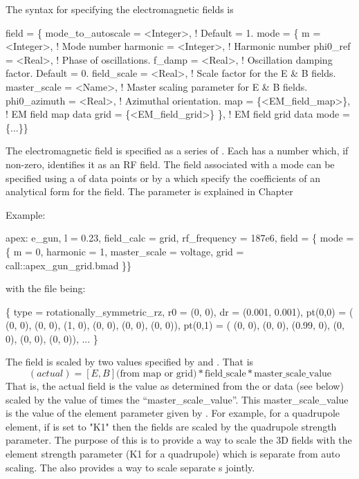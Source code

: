 The syntax for specifying the electromagnetic fields is
\label{v:field}
\begin{example}
  field = \{
    mode_to_autoscale = <Integer>, ! Default = 1.
    mode = \{
      m             = <Integer>,   ! Mode number
      harmonic      = <Integer>,   ! Harmonic number 
      phi0_ref      = <Real>,      ! Phase of oscillations.
      f_damp        = <Real>,      ! Oscillation damping factor. Default = 0.
      field_scale   = <Real>,      ! Scale factor for the E & B fields.
      master_scale  = <Name>,      ! Master scaling parameter for E & B fields.
      phi0_azimuth  = <Real>,      ! Azimuthal orientation.
      map           = \{<EM_field_map>\},     ! EM field map data
      grid          = \{<EM_field_grid>\} \}, ! EM field grid data
    mode = \{...\}\}
\end{example}
The electromagnetic field is specified as a series of . Each
 has a  number which, if non-zero, identifies it
as an RF field. The field associated with a mode can be specified
using a  of data points or by a  which specify the
coefficients of an analytical form for the field.
The  parameter is explained in Chapter~

Example:
\begin{example}
  apex: e_gun, l = 0.23, field_calc = grid, rf_frequency = 187e6, 
    field = \{ mode = \{
      m = 0, harmonic = 1,
      master_scale = voltage,
      grid = call::apex_gun_grid.bmad \}\}
\end{example}
with the file  being:
\begin{example}
  \{
    type = rotationally_symmetric_rz,
    r0 = (0, 0),
    dr = (0.001, 0.001),
    pt(0,0) = ( (0, 0), (0, 0), (1, 0),  (0, 0), (0, 0), (0, 0)),
    pt(0,1) = ( (0, 0), (0, 0), (0.99, 0),  (0, 0), (0, 0), (0, 0)),
    ... \}
\end{example}

The field is scaled by two values specified by  and
. That is
\begin{equation}
  [E, B] (actual) = [E, B] \mbox{(from map or grid)} * 
  \mbox{field_scale} * \mbox{master_scale_value}
\end{equation}
That is, the actual field is the value as determined from the 
or  data (see below) scaled by the value of 
times the ``master_scale_value''. This master_scale_value is the value
of the element parameter given by . For example, for
a quadrupole element, if  is set to "K1" then the
fields are scaled by the quadrupole strength parameter. The purpose of
this  is to provide a way to scale the 3D fields with
the element strength parameter (K1 for a quadrupole) which is separate
from auto scaling. The  also provides a way to scale
separate s jointly.

